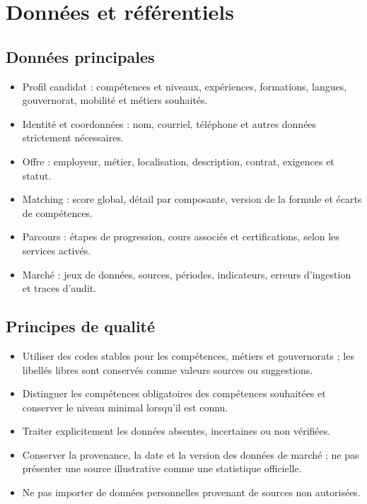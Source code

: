 \documentclass[11pt,a4paper]{article}
\begin{document}
\section{Données et référentiels}

\subsection{Données principales}
\begin{itemize}
  \item Profil candidat : compétences et niveaux, expériences, formations, langues, gouvernorat, mobilité et métiers souhaités.
  \item Identité et coordonnées : nom, courriel, téléphone et autres données strictement nécessaires.
  \item Offre : employeur, métier, localisation, description, contrat, exigences et statut.
  \item Matching : score global, détail par composante, version de la formule et écarts de compétences.
  \item Parcours : étapes de progression, cours associés et certifications, selon les services activés.
  \item Marché : jeux de données, sources, périodes, indicateurs, erreurs d'ingestion et traces d'audit.
\end{itemize}

\subsection{Principes de qualité}
\begin{itemize}
  \item Utiliser des codes stables pour les compétences, métiers et gouvernorats ; les libellés libres sont conservés comme valeurs sources ou suggestions.
  \item Distinguer les compétences obligatoires des compétences souhaitées et conserver le niveau minimal lorsqu'il est connu.
  \item Traiter explicitement les données absentes, incertaines ou non vérifiées.
  \item Conserver la provenance, la date et la version des données de marché ; ne pas présenter une source illustrative comme une statistique officielle.
  \item Ne pas importer de données personnelles provenant de sources non autorisées.
\end{itemize}
\end{document}
